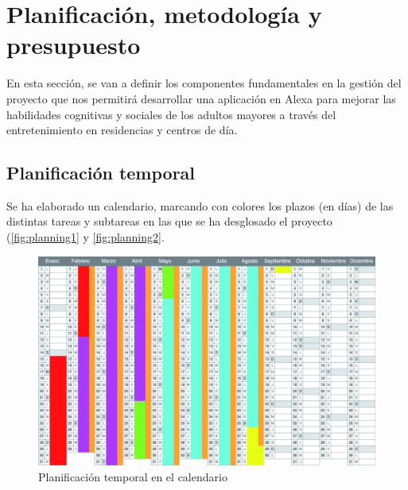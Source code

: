 \section{Planificación, metodología y presupuesto}

En esta sección, se van a definir los componentes fundamentales en la gestión del proyecto que nos permitirá desarrollar una aplicación en Alexa para mejorar las habilidades cognitivas y sociales de los adultos mayores a través del entretenimiento en residencias y centros de día.

\subsection{Planificación temporal}

Se ha elaborado un calendario, marcando con colores los plazos (en días) de las distintas tareas y subtareas en las que se ha desglosado el proyecto (\autoref{fig:planning1} y \ref{fig:planning2}.

\begin{figure}[H]
	\centering
	\includegraphics[width=1\textwidth]{imgs/tabla-planning1.jpg}
	\caption{Planificación temporal en el calendario}
	\label{fig:planning1}
\end{figure}

